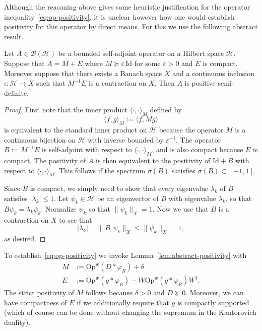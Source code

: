 \documentclass[11pt]{amsart}
\def\Op{\mathrm{Op}}
\def\Id{\mathrm{Id}}
\def\eps{{\varepsilon}}
\newcommand{\mcal}[1]{{\mathcal{#1}}}
\numberwithin{equation}{section}
\begin{document}
Although the reasoning above gives some heuristic justification for the operator inequality~\eqref{eq:op-positivity}, it is unclear however how one would establish
positivity for this operator by direct means.  
For this we use the following abstract
result.
\begin{lemma}
\label{lem:abstract-positivity}
Let $A \in\mcal{B}(\mcal{H})$ be a bounded self-adjoint operator on a Hilbert space $\mcal{H}$.  Suppose
that $A = M+E$ where $M \succeq \eps\,\Id$ for some $\eps>0$ and $E$ is compact.  Moreover suppose that there exists a Banach space $X$ and a continuous inclusion $\iota: \mcal{H}\to X$ such that $M^{-1}E$ is a contraction on $X$.
 Then $A$ is positive semi-definite.
\end{lemma}
\begin{proof}
First note that the inner product $\langle \cdot,\cdot\rangle_M$ defined by
\[
\langle f,g\rangle_M :=
\langle f, Mg\rangle
\]
is equivalent to the standard inner product on $\mcal{H}$ because the operator $M$ is a continuous bijection on $\mcal{H}$ with inverse bounded by $\eps^{-1}$.  The operator $B := M^{-1}E$ is self-adjoint with respect to $\langle\cdot,\cdot\rangle_M$, and is also
compact because $E$ is compact.
The positivity of $A$ is then equivalent to the positivity of $\Id+B$
with respect to $\langle \cdot,\cdot\rangle_M$.  This follows if the spectrum $\sigma(B)$ satisfies $\sigma(B)\subset [-1,1]$.

Since $B$ is compact, we
simply need to show that every eigenvalue
$\lambda_k$ of $B$ satisfies $|\lambda_k|\leq 1$.
Let $\psi_k\in\mcal{H}$ be an eigenvector of $B$ with eigenvalue $\lambda_k$, so that $B \psi_k= \lambda_k\psi_k$.
Normalize $\psi_k$ so that $\|\psi_k\|_X=1$. Now we use that $B$ is a contraction on $X$ to see that
\[
|\lambda_k|
= \|B_\eps \psi_k\|_X \leq \|\psi_k\|_X = 1,
\]
as desired.
\end{proof}

To establish~\eqref{eq:op-positivity} we invoke Lemma~\ref{lem:abstract-positivity} with
\begin{align*}
M &:= \Op^w(D\ast \varphi_{R})+\delta \\
E &:= \Op^w(g\ast \varphi_R) - W \Op^w(g\ast \varphi_R) W^\dagger.
\end{align*}
The strict positivity of $M$ follows because $\delta>0$ and $D \succeq 0$.
Moreover, we can have compactness of $E$ if we additionally require that $g$ is compactly supported
(which of course can be done without changing the supremum in the Kantorovich duality).
\end{document}
